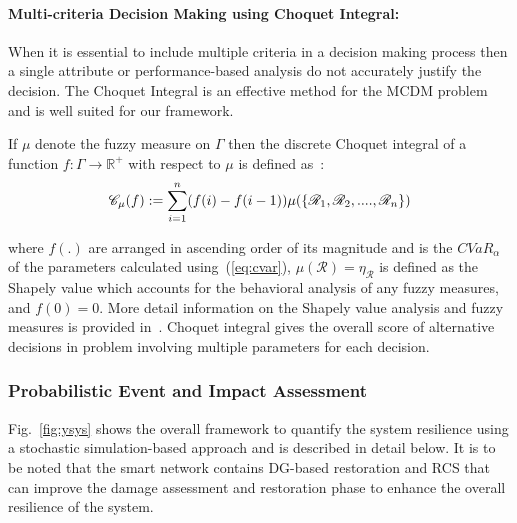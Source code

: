 \paragraph{Multi-criteria Decision Making using Choquet Integral:}
When it is essential to include multiple criteria in a decision making process then a single attribute or performance-based analysis do not accurately justify the decision. The Choquet Integral is an effective method for the MCDM problem~\cite{choquet} and is well suited for our framework.

If $\mu$ denote the fuzzy measure on $\Gamma$ then the discrete Choquet integral of a function $f:\Gamma\rightarrow\mathbb{R}^+$ with respect to $\mu$ is defined as~\cite{choquet}:
\vspace{-3pt}
\begin{equation} \small
    \mathcal{C}_\mu(f) := \sum_{i=1}^{n}(f(i)-f(i-1))\mu(\{\mathcal{R}_1, \mathcal{R}_2, .... , \mathcal{R}_n\})
    \label{eq:choquet}
\end{equation}

\noindent
where $f(.)$ are arranged in ascending order of its magnitude and is the $CVaR_\alpha$ of the parameters calculated using~(\ref{eq:cvar}), $\mu({\mathcal{R}})=\eta_\mathcal{R}$ is defined as the Shapely value which accounts for the behavioral analysis of any fuzzy measures, and $f(0) = 0$. More detail information on the Shapely value analysis and fuzzy measures is provided in~\cite{2006}. Choquet integral gives the overall score of alternative decisions in problem involving multiple parameters for each decision.

\subsubsection{Probabilistic Event and Impact Assessment}
Fig.~\ref{fig:ysys} shows the overall framework to quantify the system resilience using a stochastic simulation-based approach and is described in detail below. It is to be noted that the smart network contains DG-based restoration and RCS that can improve the damage assessment and restoration phase to enhance the overall resilience of the system.   
\begin{figure*}[t]
    \centering
    \vspace{-0.2 cm}
    \caption{Simulation-based framework for resilience metric computation; Fragility modeling feeds the failure probability to Monte-Carlo simulation. Monte-Carlo simulation calculates the average value of a performance measure for a given event. $CVaR_\alpha$ is then calculated using the pdf of a given extreme event case.}
    \label{fig:ysys}
    \vspace{-0.3 cm}
\end{figure*}

